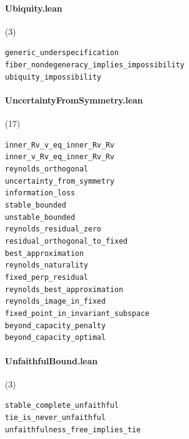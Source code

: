 \paragraph{Ubiquity.lean} (3)

{\footnotesize
\texttt{generic\_underspecification}\\
\texttt{fiber\_nondegeneracy\_implies\_impossibility}\\
\texttt{ubiquity\_impossibility}\\
}

\paragraph{UncertaintyFromSymmetry.lean} (17)

{\footnotesize
\texttt{inner\_Rv\_v\_eq\_inner\_Rv\_Rv}\\
\texttt{inner\_v\_Rv\_eq\_inner\_Rv\_Rv}\\
\texttt{reynolds\_orthogonal}\\
\texttt{uncertainty\_from\_symmetry}\\
\texttt{information\_loss}\\
\texttt{stable\_bounded}\\
\texttt{unstable\_bounded}\\
\texttt{reynolds\_residual\_zero}\\
\texttt{residual\_orthogonal\_to\_fixed}\\
\texttt{best\_approximation}\\
\texttt{reynolds\_naturality}\\
\texttt{fixed\_perp\_residual}\\
\texttt{reynolds\_best\_approximation}\\
\texttt{reynolds\_image\_in\_fixed}\\
\texttt{fixed\_point\_in\_invariant\_subspace}\\
\texttt{beyond\_capacity\_penalty}\\
\texttt{beyond\_capacity\_optimal}\\
}

\paragraph{UnfaithfulBound.lean} (3)

{\footnotesize
\texttt{stable\_complete\_unfaithful}\\
\texttt{tie\_is\_never\_unfaithful}\\
\texttt{unfaithfulness\_free\_implies\_tie}\\
}

